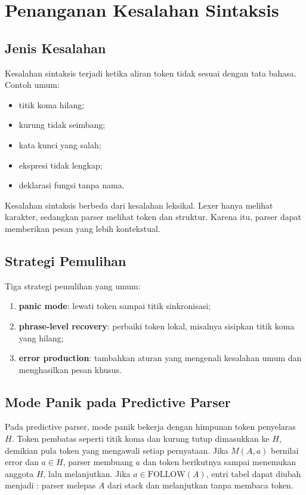 \section{Penanganan Kesalahan Sintaksis}
\label{sec:ch10-error}

\subsection{Jenis Kesalahan}

Kesalahan sintaksis terjadi ketika aliran token tidak sesuai dengan
tata bahasa. Contoh umum:
\begin{itemize}[leftmargin=*]
  \item titik koma hilang;
  \item kurung tidak seimbang;
  \item kata kunci yang salah;
  \item ekspresi tidak lengkap;
  \item deklarasi fungsi tanpa nama.
\end{itemize}

Kesalahan sintaksis berbeda dari kesalahan leksikal. Lexer hanya
melihat karakter, sedangkan parser melihat token dan struktur.
Karena itu, parser dapat memberikan pesan yang lebih kontekstual.

\subsection{Strategi Pemulihan}

Tiga strategi pemulihan yang umum:
\begin{enumerate}[label=\arabic*.,leftmargin=*]
  \item \textbf{panic mode}: lewati token sampai titik sinkronisasi;
  \item \textbf{phrase-level recovery}: perbaiki token lokal, misalnya
        sisipkan titik koma yang hilang;
  \item \textbf{error production}: tambahkan aturan yang mengenali
        kesalahan umum dan menghasilkan pesan khusus.
\end{enumerate}

\subsection{Mode Panik pada Predictive Parser}

Pada predictive parser, mode panik bekerja dengan himpunan token
penyelaras \(H\). Token pembatas seperti titik koma dan kurung tutup
dimasukkan ke \(H\), demikian pula token yang mengawali setiap
pernyataan. Jika \(M(A,a)\) bernilai error dan \(a \in H\), parser
membuang \(a\) dan token berikutnya sampai menemukan anggota \(H\),
lalu melanjutkan. Jika \(a \in \mathrm{FOLLOW}(A)\), entri tabel
dapat diubah menjadi : parser melepas \(A\) dari stack
dan melanjutkan tanpa membaca token.

